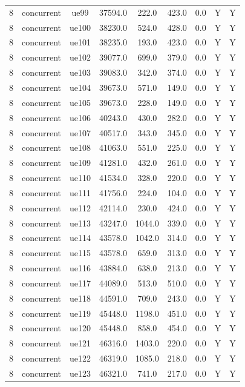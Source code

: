 \begin{table}[ht]
\begin{tabular}{|c|c|c|c|c|c|c|c|c|}
8 & concurrent & ue99 & 37594.0 & 222.0 & 423.0 & 0.0 & Y & Y \\
8 & concurrent & ue100 & 38230.0 & 524.0 & 428.0 & 0.0 & Y & Y \\
8 & concurrent & ue101 & 38235.0 & 193.0 & 423.0 & 0.0 & Y & Y \\
8 & concurrent & ue102 & 39077.0 & 699.0 & 379.0 & 0.0 & Y & Y \\
8 & concurrent & ue103 & 39083.0 & 342.0 & 374.0 & 0.0 & Y & Y \\
8 & concurrent & ue104 & 39673.0 & 571.0 & 149.0 & 0.0 & Y & Y \\
8 & concurrent & ue105 & 39673.0 & 228.0 & 149.0 & 0.0 & Y & Y \\
8 & concurrent & ue106 & 40243.0 & 430.0 & 282.0 & 0.0 & Y & Y \\
8 & concurrent & ue107 & 40517.0 & 343.0 & 345.0 & 0.0 & Y & Y \\
8 & concurrent & ue108 & 41063.0 & 551.0 & 225.0 & 0.0 & Y & Y \\
8 & concurrent & ue109 & 41281.0 & 432.0 & 261.0 & 0.0 & Y & Y \\
8 & concurrent & ue110 & 41534.0 & 328.0 & 220.0 & 0.0 & Y & Y \\
8 & concurrent & ue111 & 41756.0 & 224.0 & 104.0 & 0.0 & Y & Y \\
8 & concurrent & ue112 & 42114.0 & 230.0 & 424.0 & 0.0 & Y & Y \\
8 & concurrent & ue113 & 43247.0 & 1044.0 & 339.0 & 0.0 & Y & Y \\
8 & concurrent & ue114 & 43578.0 & 1042.0 & 314.0 & 0.0 & Y & Y \\
8 & concurrent & ue115 & 43578.0 & 659.0 & 313.0 & 0.0 & Y & Y \\
8 & concurrent & ue116 & 43884.0 & 638.0 & 213.0 & 0.0 & Y & Y \\
8 & concurrent & ue117 & 44089.0 & 513.0 & 510.0 & 0.0 & Y & Y \\
8 & concurrent & ue118 & 44591.0 & 709.0 & 243.0 & 0.0 & Y & Y \\
8 & concurrent & ue119 & 45448.0 & 1198.0 & 451.0 & 0.0 & Y & Y \\
8 & concurrent & ue120 & 45448.0 & 858.0 & 454.0 & 0.0 & Y & Y \\
8 & concurrent & ue121 & 46316.0 & 1403.0 & 220.0 & 0.0 & Y & Y \\
8 & concurrent & ue122 & 46319.0 & 1085.0 & 218.0 & 0.0 & Y & Y \\
8 & concurrent & ue123 & 46321.0 & 741.0 & 217.0 & 0.0 & Y & Y \\

\end{tabular}
\end{table}
